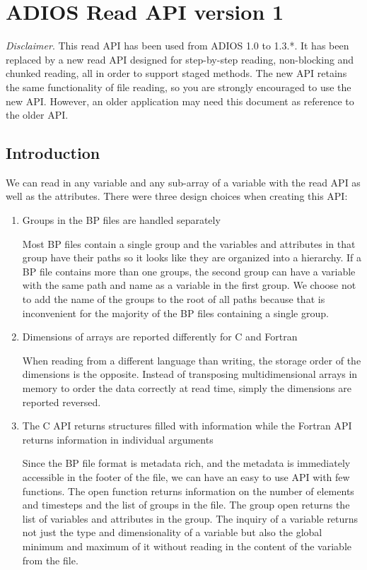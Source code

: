 \documentclass{report}
\begin{document}
\chapter{ADIOS Read API version 1}

\emph {Disclaimer}.
This read API has been used from ADIOS 1.0 to 1.3.*. It has been replaced by a new 
read API designed for step-by-step reading, non-blocking and chunked reading, all 
in order to support staged methods. The new API retains the same functionality of 
file reading, so you are strongly encouraged to use the new API. However, an older
application may need this document as reference to the older API. 

\section{Introduction}

We can read in any variable and any sub-array of a variable with the read API as 
well as the attributes. There were three design choices when creating this API:

\begin{enumerate}
\item Groups in the BP files are handled separately

Most BP files contain a single group and the variables and attributes in that group 
have their paths so it looks like they are organized into a hierarchy. If a BP 
file contains more than one groups, the second group can have a variable with the 
same path and name as a variable in the first group. We choose not to add the name 
of the groups to the root of all paths because that is inconvenient for the majority 
of the BP files containing a single group.

\item Dimensions of arrays are reported differently for C and Fortran

When reading from a different language than writing, the storage order of the dimensions 
is the opposite. Instead of transposing multidimensional arrays in memory to order 
the data correctly at read time, simply the dimensions are reported reversed. 

\item The C API returns structures filled with information while the Fortran API returns 
information in individual arguments

Since the BP file format is metadata rich, and the metadata is immediately accessible 
in the footer of the file, we can have an easy to use API with few functions. The 
open function returns information on the number of elements and timesteps and the 
list of groups in the file. The group open returns the list of variables and attributes 
in the group. The inquiry of a variable returns not just the type and dimensionality 
of a variable but also the global minimum and maximum of it without reading in 
the content of the variable from the file. 
\end{enumerate}
\end{document}
